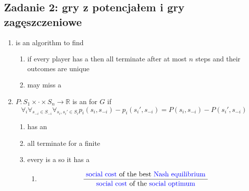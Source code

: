 \subsection{Zadanie 2: gry z potencjałem i gry zagęszczeniowe}

\begin{enumerate}

  \item
    is an algorithm to find

    \begin{enumerate}
      \item
        if every player has a
        then all
        terminate after at most $n$ steps and their outcomes are unique
      \item
        may miss a
    \end{enumerate}
  \item
    $P: S_1\times \cdot \times S_n \rightarrow \mathbb{R}$ is an
    for $G$ if
    $$
    \forall_i \forall_{s_{-i} \in S_{-i}} \forall_{s_i, s_i' \in S_i}
    p_i(s_i, s_{-i}) -
    p_i(s_i', s_{-i}) =
    P(s_i, s_{-i}) -
    P(s_i', s_{-i})
    $$
    \begin{enumerate}
      \item
        has an

      \item
        all
        terminate for a finite

      \item
        every
        is a
        so it has a

        \begin{enumerate}
          \item
            $$
            \frac{\text{
              {\color{blue}{social cost}}
            of the best
            {\color{blue}{Nash equilibrium}}
          }}{{\text{
            {\color{blue}{social cost}}
            of the
            {\color{blue}{social optimum}}
          }}}
            $$
        \end{enumerate}
    \end{enumerate}

\end{enumerate}

